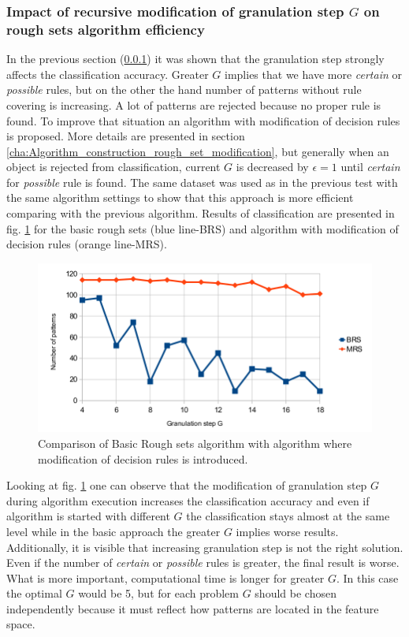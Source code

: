 \subsubsection{Impact of recursive modification of granulation step $G$ on rough
sets algorithm efficiency}
\label{cha:Simulation_reaearch_2}
In the previous section (\ref{cha:Simulation_reaearch_2}) it was shown that the
granulation step strongly affects the classification accuracy.
Greater $G$ implies that we have more \textit{certain} or \textit{possible}
rules, but on the other the hand number of patterns without rule covering is 
increasing. A lot of patterns are rejected because no proper rule is found. To improve that
situation an algorithm with modification of decision rules is proposed. More
details are presented in section \ref{cha:Algorithm_construction_rough_set_modification}, but generally when an
object is rejected from classification, current $G$ is decreased by $\epsilon=1$ until 
\textit{certain} for \textit{possible} rule is found. The same dataset was used as in
the previous test with the same algorithm settings to show that this approach
is more efficient comparing with the previous algorithm. Results of classification
are presented in fig. \ref{fig:Simulation_research_2} for the basic rough
sets (blue line-BRS) and algorithm with modification of decision rules (orange
line-MRS).
\begin{figure}[H]
    \begin{center}
        \includegraphics[width=\textwidth]{fig/rough_chart.png}
    \end{center}
    \caption{Comparison of Basic Rough sets algorithm with algorithm where
    modification of decision rules is introduced.}
    \label{fig:Simulation_research_2}
\end{figure}

Looking at fig. \ref{fig:Simulation_research_2} one can observe that
the modification of granulation step $G$ during algorithm execution increases 
the classification accuracy and even if algorithm is started with different $G$
the classification stays almost at the same level while in the basic approach the 
greater $G$ implies worse results. Additionally, it is visible that increasing granulation 
step is not the right solution. Even if the number of \textit{certain} or
\textit{possible} rules is greater, the final result is worse. What is more
important, computational time is longer for greater $G$. In this case the optimal 
$G$ would be 5, but for each problem $G$ should be chosen independently because 
it must reflect how patterns are located in the feature space.

